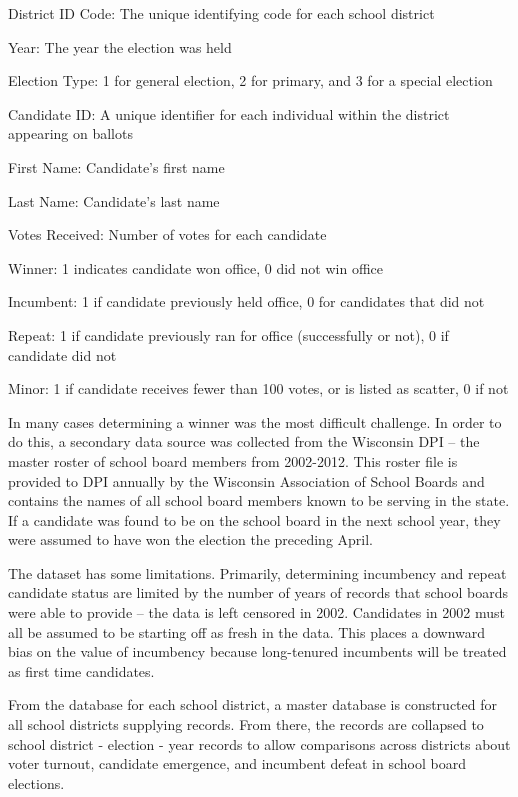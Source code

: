 \begin{myitemize}
\item District ID Code: The unique identifying code for each school district
\item Year: The year the election was held
\item Election Type: 1 for general election, 2 for primary, and 3 for a special election
\item Candidate ID: A unique identifier for each individual within the district appearing on ballots
\item First Name: Candidate's first name
\item Last Name: Candidate's last name
\item Votes Received: Number of votes for each candidate
\item Winner: 1 indicates candidate won office, 0 did not win office
\item Incumbent: 1 if candidate previously held office, 0 for candidates that did not
\item Repeat: 1 if candidate previously ran for office (successfully or not), 0 if candidate did not
\item Minor: 1 if candidate receives fewer than 100 votes, or is listed as scatter, 0 if not
\end{myitemize}

In many cases determining a winner was the most difficult challenge. In order to 
do this, a secondary data source was collected from the Wisconsin DPI -- the master 
roster of school board members from 2002-2012. This roster file is provided to 
DPI annually by the Wisconsin Association of School Boards and contains the names 
of all school board members known to be serving in the state. If a candidate was 
found to be on the school board in the next school year, they were assumed to have 
won the election the preceding April. 

The dataset has some limitations. Primarily, determining incumbency and repeat 
candidate status are limited by the number of years of records that school 
boards were able to provide -- the data is left censored in 2002. Candidates in 
2002 must all be assumed to be starting off as fresh in the data. This places a 
downward bias on the value of incumbency because long-tenured incumbents will 
be treated as first time candidates. 

From the database for each school district, a master database is constructed 
for all school districts supplying records. From there, the records are collapsed 
to school district - election - year records to allow comparisons across districts 
about voter turnout, candidate emergence, and incumbent defeat in school board 
elections. 

